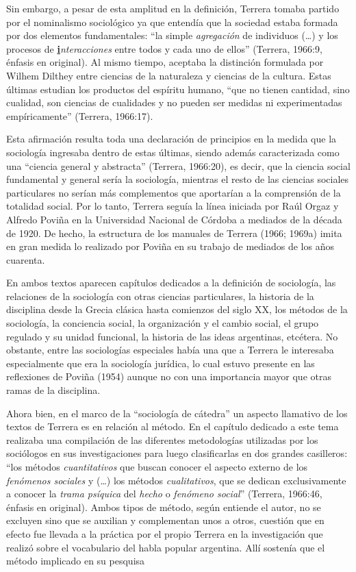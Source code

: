 Sin embargo, a pesar de esta amplitud en la definición, Terrera tomaba partido por el nominalismo sociológico ya que entendía que la sociedad estaba formada por dos elementos fundamentales: ``la simple \emph{agregación} de individuos (\ldots) y los procesos de \textbf{\ul{i}}\emph{nteracciones} entre todos y cada uno de ellos'' (Terrera, 1966:9, énfasis en original). Al mismo tiempo, aceptaba la distinción formulada por Wilhem Dilthey entre ciencias de la naturaleza y ciencias de la cultura. Estas últimas estudian los productos del espíritu humano, ``que no tienen cantidad, sino cualidad, son ciencias de cualidades y no pueden ser medidas ni experimentadas empíricamente'' (Terrera, 1966:17).

Esta afirmación resulta toda una declaración de principios en la medida que la sociología ingresaba dentro de estas últimas, siendo además caracterizada como una ``ciencia general y abstracta'' (Terrera, 1966:20), es decir, que la ciencia social fundamental y general sería la sociología, mientras el resto de las ciencias sociales particulares no serían más complementos que aportarían a la comprensión de la totalidad social. Por lo tanto, Terrera seguía la línea iniciada por Raúl Orgaz y Alfredo Poviña en la Universidad Nacional de Córdoba a mediados de la década de 1920. De hecho, la estructura de los manuales de Terrera (1966; 1969a) imita en gran medida lo realizado por Poviña en su trabajo de mediados de los años cuarenta.

En ambos textos aparecen capítulos dedicados a la definición de sociología, las relaciones de la sociología con otras ciencias particulares, la historia de la disciplina desde la Grecia clásica hasta comienzos del siglo XX, los métodos de la sociología, la conciencia social, la organización y el cambio social, el grupo regulado y su unidad funcional, la historia de las ideas argentinas, etcétera. No obstante, entre las sociologías especiales había una que a Terrera le interesaba especialmente que era la sociología jurídica, lo cual estuvo presente en las reflexiones de Poviña (1954) aunque no con una importancia mayor que otras ramas de la disciplina.

Ahora bien, en el marco de la ``sociología de cátedra'' un aspecto llamativo de los textos de Terrera es en relación al método. En el capítulo dedicado a este tema realizaba una compilación de las diferentes metodologías utilizadas por los sociólogos en sus investigaciones para luego clasificarlas en dos grandes casilleros: ``los métodos \emph{cuantitativos} que buscan conocer el aspecto externo de los \emph{fenómenos sociales} y (\ldots) los métodos \emph{cualitativos}, que se dedican exclusivamente a conocer la \emph{trama psíquica} del \emph{hecho} o \emph{fenómeno social}'' (Terrera, 1966:46, énfasis en original). Ambos tipos de método, según entiende el autor, no se excluyen sino que se auxilian y complementan unos a otros, cuestión que en efecto fue llevada a la práctica por el propio Terrera en la investigación que realizó sobre el vocabulario del habla popular argentina. Allí sostenía que el método implicado en su pesquisa

